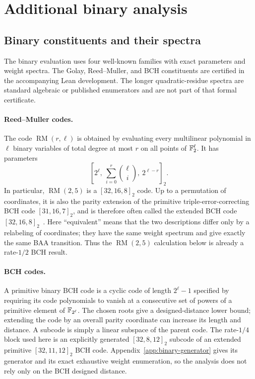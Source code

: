 \section{Additional binary analysis}

\subsection{Binary constituents and their spectra}
\label{app:constituents}



The binary evaluation uses four well-known families with exact parameters and
weight spectra.  The Golay, Reed--Muller, and BCH constituents are certified in
the accompanying Lean development.  The longer quadratic-residue spectra are
standard algebraic or published enumerators and are not part of that formal
certificate.

\paragraph{Reed--Muller codes.}
The code $\operatorname{RM}(r,\ell)$ is obtained by evaluating every
multilinear polynomial in $\ell$ binary variables of total degree at most $r$
on all points of $\mathbb F_2^\ell$.  It has parameters
\[
    \left[2^\ell,\ \sum_{i=0}^r\binom{\ell}{i},\ 2^{\ell-r}\right]_2.
\]
In particular, $\operatorname{RM}(2,5)$ is a $[32,16,8]_2$ code.  Up to a
permutation of coordinates, it is also the parity extension of the primitive
triple-error-correcting BCH code $[31,16,7]_2$, and is therefore often called
the extended BCH code $[32,16,8]_2$~\cite{macwilliams}.  Here ``equivalent''
means that the two descriptions differ only by a relabeling of coordinates;
they have the same weight spectrum and give exactly the same BAA transition.
Thus the $\operatorname{RM}(2,5)$ calculation below is already a rate-$1/2$
BCH result.

\paragraph{BCH codes.}
A primitive binary BCH code is a cyclic code of length $2^\ell-1$ specified by
requiring its code polynomials to vanish at a consecutive set of powers of a
primitive element of $\mathbb F_{2^\ell}$.  The chosen roots give a designed-distance
lower bound; extending the code by an overall parity coordinate can increase
its length and distance.  A subcode is simply a linear subspace of the
parent code.  The rate-$1/4$ block used here is an explicitly generated
$[32,8,12]_2$ subcode of an extended primitive $[32,11,12]_2$ BCH code.
Appendix~\ref{app:binary-generator} gives its generator and its exact exhaustive
weight enumeration, so the analysis does not rely only on the BCH designed
distance.

